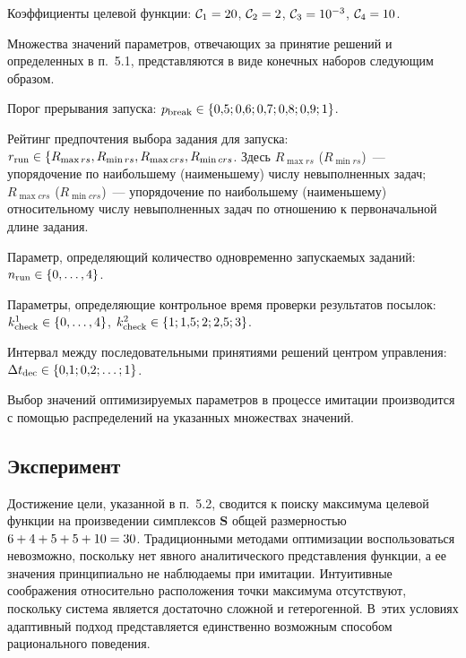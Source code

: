 \begin{multicols}{2}
    Коэффициенты целевой функции: $\mathcal{C}_1\hm=20$, $\mathcal{C}_2\hm=2$, 
$\mathcal{C}_{3}\hm=10^{-3}$, $\mathcal{C}_4\hm=10$.
    
    Множества значений параметров, отвечающих за принятие решений и 
определенных в п.~5.1, представляются в виде конечных наборов 
следующим образом.
    
    Порог прерывания запуска: $p_{\mathrm{break}}\hm\in \{0{,}5; 0{,}6; 
0{,}7; 0{,}8; 0{,}9; 1\}$.
    
    Рейтинг предпочтения выбора задания для запуска: 
$r_{\mathrm{run}}\hm\in \{R_{\max rs}, R_{\min rs}, R_{\max crs}, R_{\min 
crs}$. Здесь $R_{\max rs}$ ($R_{\min rs}$)~--- упорядочение по наибольшему 
(наименьшему) числу невыполненных задач; $R_{\max crs}$ ($R_{\min 
crs}$)~--- упорядочение по наибольшему (наименьшему) относительному 
числу невыполненных задач по отношению к первоначальной длине 
задания.
    
    Параметр, определяющий количество одновременно запускаемых 
заданий: $n_{\mathrm{run}}\hm\in \{0,\ldots , 4\}$.
    
    Параметры, определяющие контрольное время проверки результатов 
посылок: $k^1_{\mathrm{check}}\hm\in \{0,\ldots ,4\}$, 
$k^2_{\mathrm{check}}\hm\in \{1; 1{,}5; 2; 2{,}5; 3\}$.
    
    Интервал между последовательными принятиями решений центром 
управления: $\Delta t_{\mathrm{dec}}\hm\in \{0{,}1; 0{,}2; \ldots ; 1\}$.
    
    Выбор значений оптимизируемых параметров в процессе имитации 
производится с помощью распределений на указанных множествах 
значений.

\subsection{Эксперимент}
    
    Достижение цели, указанной в п.~5.2, сводится к поиску максимума 
целевой функции на произведении симплексов $\mathbf{S}$ общей 
размерностью $6\hm+4\hm+5\hm+5\hm+10\hm=30$. Традиционными 
методами оптимизации воспользоваться невозможно, поскольку нет явного 
аналитического представления функции, а ее значения принципиально не 
наблюдаемы при имитации. Интуитивные соображения относительно 
расположения точки максимума отсутствуют, поскольку система является 
достаточно сложной и гетерогенной. В~этих условиях адаптивный подход 
представляется единственно возможным способом рационального 
поведения.
    

\end{multicols}

